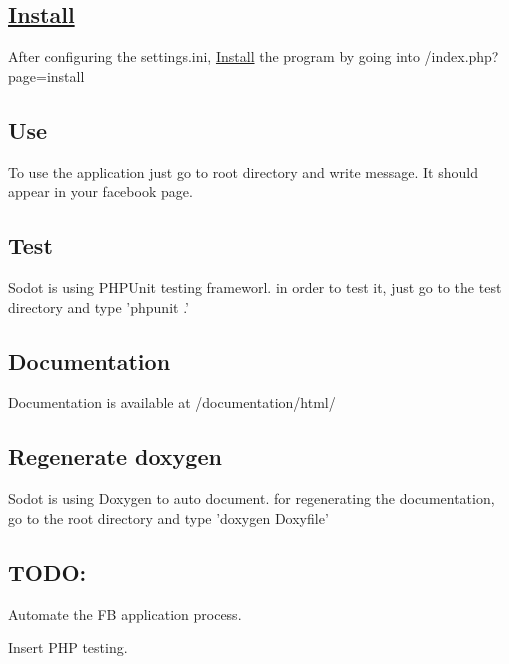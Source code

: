 \subsection*{\hyperlink{classInstall}{Install}}

After configuring the settings.\-ini, \hyperlink{classInstall}{Install} the program by going into /index.php?page=install

\subsection*{Use}

To use the application just go to root directory and write message. It should appear in your facebook page.

\subsection*{Test}

Sodot is using P\-H\-P\-Unit testing frameworl. in order to test it, just go to the test directory and type 'phpunit .'

\subsection*{Documentation}

Documentation is available at /documentation/html/

\subsection*{Regenerate doxygen}

Sodot is using Doxygen to auto document. for regenerating the documentation, go to the root directory and type 'doxygen Doxyfile'

\subsection*{T\-O\-D\-O\-:}


\begin{DoxyEnumerate}
\item Automate the F\-B application process.
\item Insert P\-H\-P testing. 
\end{DoxyEnumerate}